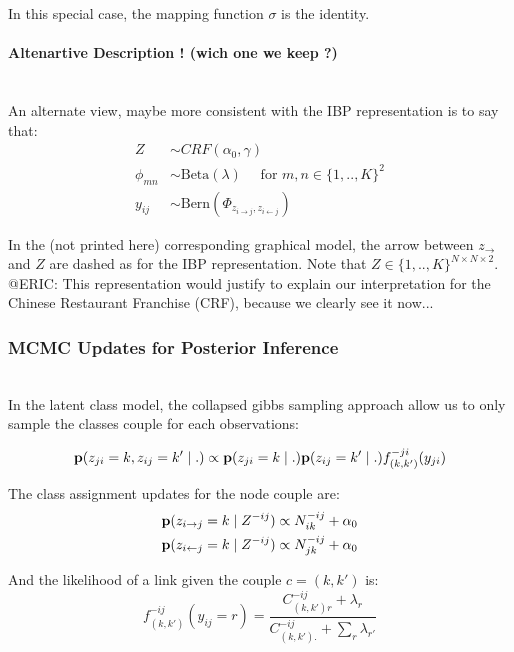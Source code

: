 In this special case, the mapping function $\sigma$ is the identity.

\paragraph{Altenartive Description ! (wich one we keep ?)}~\\

An alternate view, maybe more consistent with the IBP representation is to say that:
\begin{align}
Z &\sim CRF(\alpha_0, \gamma) \\
\phi_{mn} &\sim \mathrm{Beta}(\lambda) \quad\text{ for }  m,n \in \{1, .., K\}^2  \\
y_{ij} &\sim \mathrm{Bern}(\Phi_{z_{i\rightarrow j} , z_{i\leftarrow j}})
\end{align}

In the (not printed here) corresponding graphical model, the arrow between $z_{\rightarrow}$ and $Z$ are dashed as for the IBP representation. Note that $Z \in \{1,.., K\}^{N\times N \times 2}$. ~\\

@ERIC: This representation would justify to explain our interpretation for the Chinese Restaurant Franchise (CRF), because we clearly see it now...

\subsubsection{MCMC Updates for Posterior Inference}~\\

In the latent class model, the collapsed gibbs sampling approach allow us to only sample the classes couple for each observations:

\begin{equation}
\mathbf{p}(z_{ji}=k, z_{ij}=k' \mid .) \propto \mathbf{p}(z_{ji}=k \mid .) \mathbf{p}(z_{ij}=k' \mid .) f_{(k,k')}^{-ji}(y_{ji})
\end{equation}


The class assignment updates for the node couple are:
\begin{align}
\mathbf{p}(z_{i\rightarrow j} =k \mid Z^{-ij}) &\propto N_{ik}^{-ij} + \alpha_0 \\
\mathbf{p}(z_{i\leftarrow j} =k \mid Z^{-ij}) &\propto N_{jk}^{-ij} + \alpha_0 
\end{align}

And the likelihood of a link given the couple $c=(k, k')$ is:
\begin{equation} \label{eq:cgs_mmsb}
f_{(k, k')}^{-ij}(y_{ij}=r) = \frac{C_{(k,k')r}^{-ij} + \lambda_r}{C_{(k,k')\bm{.}}^{-ij} + \sum_r\lambda_{r'}} 
\end{equation}

